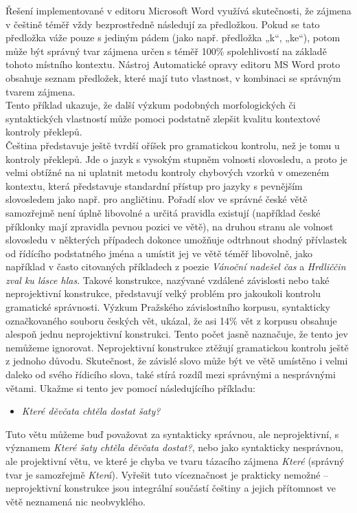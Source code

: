 \begin{multicols}{2}
Řešení implementované v editoru Microsoft Word využívá skutečnosti, že zájmena v češtině téměř vždy bezprostředně následují za předložkou. Pokud se tato předložka váže pouze s jediným pádem (jako např. předložka „k“, „ke“), potom může být správný tvar zájmena určen s téměř 100\% spolehlivostí na základě tohoto místního kontextu. Nástroj Automatické opravy editoru MS Word proto obsahuje seznam předložek, které mají tuto vlastnost, v kombinaci se správným tvarem zájmena.\\
Tento příklad ukazuje, že další výzkum podobných morfologických či syntaktických vlastností může pomoci podstatně zlepšit kvalitu kontextové kontroly překlepů.\\
Čeština představuje ještě tvrdší oříšek pro gramatickou kontrolu, než je tomu u kontroly překlepů. Jde o jazyk s vysokým stupněm volnosti slovosledu, a proto je velmi obtížné na ni uplatnit metodu kontroly chybových vzorků v omezeném kontextu, která představuje standardní přístup pro jazyky s pevnějším slovosledem jako např. pro angličtinu. Pořadí slov ve správné české větě samozřejmě není úplně libovolné a určitá pravidla existují (například české příklonky mají zpravidla pevnou pozici ve větě), na druhou stranu ale volnost slovosledu v některých případech dokonce umožňuje odtrhnout shodný přívlastek od řídícího podstatného jména a umístit jej ve větě téměř libovolně, jako například v často citovaných příkladech z poezie \textit{Vánoční nadešel čas} a \textit{Hrdliččin zval ku lásce hlas}. Takové konstrukce, nazývané vzdálené závislosti nebo také neprojektivní konstrukce, představují velký problém pro jakoukoli kontrolu gramatické správnosti. Výzkum Pražského závislostního korpusu, syntakticky označkovaného souboru českých vět, ukázal, že asi 14\% vět z korpusu obsahuje alespoň jednu neprojektivní konstrukci. Tento počet jasně naznačuje, že tento jev nemůžeme ignorovat. Neprojektivní konstrukce ztěžují gramatickou kontrolu ještě z jednoho důvodu. Skutečnost, že závislé slovo může být ve větě umístěno i velmi daleko od svého řídicího slova, také stírá rozdíl mezi správnými a nesprávnými větami. Ukažme si tento jev pomocí následujícího příkladu:
\begin{itemize}
\item[] \textit{Které děvčata chtěla dostat šaty?}
\end{itemize}
Tuto větu můžeme buď považovat za syntakticky správnou, ale neprojektivní, s významem \textit{Které šaty chtěla děvčata dostat?}, nebo jako syntakticky nesprávnou, ale projektivní větu, ve které je chyba ve tvaru tázacího zájmena \textit{Které} (správný tvar je samozřejmě \textit{Která}). Vyřešit tuto víceznačnost je prakticky nemožné – neprojektivní konstrukce jsou integrální součástí češtiny a jejich přítomnost ve větě neznamená nic neobvyklého.

\end{multicols}
